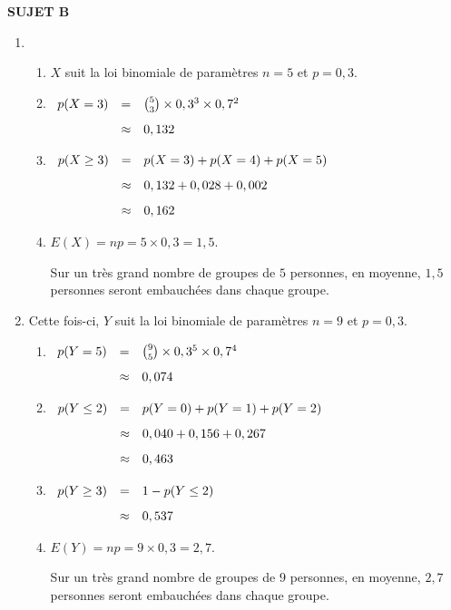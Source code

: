 \documentclass[10pt,french,openright,twoside]{book}
\begin{document}
\noindent\dotfill

\textbf{SUJET B}\medskip

\begin{enumerate}
	\item
	\begin{enumerate}
		\item $X$ suit la loi binomiale de paramètres $n = 5$ et $p = 0,3$.
		\item $\begin{array}[t]{rcl}
					p(X = 3) & = & \binom 5 3 \times 0,3^3 \times 0,7^2 \\[8pt]
							& \approx & 0,132
				\end{array}$
		\item $\begin{array}[t]{rcl}
					p(X \geq 3) & = & p(X = 3) + p(X = 4) + p(X = 5) \\[8pt]
								& \approx & 0,132 + 0,028 + 0,002 \\[8pt]
								& \approx & 0,162
				\end{array}$
		\item $E(X) = np = 5 \times 0,3 = 1,5$.\par
		Sur un très grand nombre de groupes de $5$ personnes, en moyenne, $1,5$ personnes seront embauchées dans chaque groupe.
	\end{enumerate}

	\item Cette fois-ci, $Y$ suit la loi binomiale de paramètres $n = 9$ et $p = 0,3$.
	\begin{enumerate}
		\item $\begin{array}[t]{rcl}
					p(Y = 5) & = & \binom{9}{5} \times 0,3^5 \times 0,7^4 \\[8pt]
							& \approx & 0,074
				\end{array}$
		\item $\begin{array}[t]{rcl}
					p(Y \leq 2) & = & p(Y = 0) + p(Y = 1) + p(Y = 2) \\[8pt]
								& \approx & 0,040 + 0,156 + 0,267 \\[8pt]
								& \approx & 0,463
				\end{array}$
		\item $\begin{array}[t]{rcl}
					p(Y \geq 3) & = & 1 - p(Y \leq 2) \\[8pt]
								& \approx & 0,537
				\end{array}$
		\item $E(Y) = np = 9 \times 0,3 = 2,7$.\par
		Sur un très grand nombre de groupes de $9$ personnes, en moyenne, $2,7$ personnes seront embauchées dans chaque groupe.
	\end{enumerate}
\end{enumerate}
\end{document}
